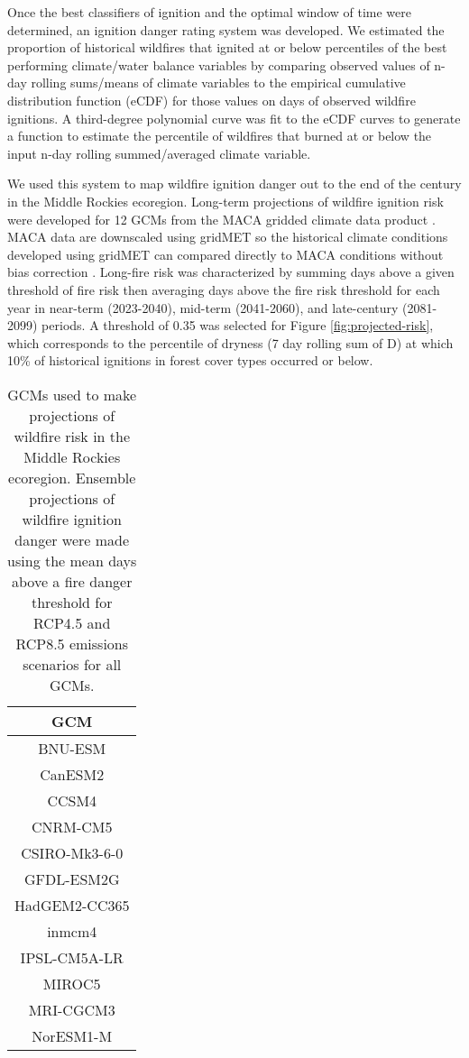 \documentclass[11pt]{article}
\begin{document}
Once the best classifiers of ignition and the optimal window of time were determined, an ignition danger rating system was developed.  We estimated the proportion of historical wildfires that ignited at or below percentiles of the best performing climate/water balance variables by comparing observed values of n-day rolling sums/means of climate variables to the empirical cumulative distribution function (eCDF) for those values on days of observed wildfire ignitions. A third-degree polynomial curve was fit to the eCDF curves to generate a function to estimate the percentile of wildfires that burned at or below the input n-day rolling summed/averaged climate variable. 

We used this system to map wildfire ignition danger out to the end of the century in the Middle Rockies ecoregion. Long-term projections of wildfire ignition risk were developed for 12 GCMs from the MACA gridded climate data product \citep{abatzoglouComparisonStatisticalDownscaling2012}.  MACA data are downscaled using gridMET so the historical climate conditions developed using gridMET can compared directly to MACA conditions without bias correction \citep{tercekRobustProjectionsConsequences2023}.  Long-fire risk was characterized by summing days above a given threshold of fire risk then averaging days above the fire risk threshold for each year in near-term (2023-2040), mid-term (2041-2060), and late-century (2081-2099) periods.  A threshold of 0.35 was selected for Figure \ref{fig:projected-risk}, which corresponds to the percentile of dryness (7 day rolling sum of D) at which 10\% of historical ignitions in forest cover types occurred or below.

\begin{table}[h!]
  \centering
  \begin{tabular}{ c }
    \hline
    GCM \\
    \hline
    BNU-ESM \\
    CanESM2 \\
    CCSM4 \\
    CNRM-CM5 \\
    CSIRO-Mk3-6-0 \\
    GFDL-ESM2G \\
    HadGEM2-CC365 \\
    inmcm4 \\
    IPSL-CM5A-LR \\
    MIROC5 \\
    MRI-CGCM3 \\
    NorESM1-M \\
    \hline
  \end{tabular}
  \caption{GCMs used to make projections of wildfire risk in the Middle Rockies ecoregion.  Ensemble projections of wildfire ignition danger were made using the mean days above a fire danger threshold for RCP4.5 and RCP8.5 emissions scenarios for all GCMs.}
  \label{table:gcms}
\end{table}
\end{document}
